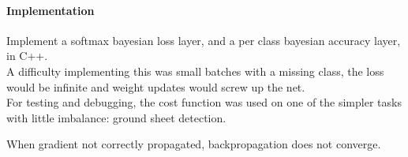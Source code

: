 \documentclass[a4paper,11pt]{article}
\begin{document}
\paragraph{Implementation}

Implement a softmax bayesian loss layer, and a per class bayesian accuracy layer, in C++. \\

A difficulty implementing this was small batches with a missing class, the loss would be infinite and weight updates would screw up the net. \\

For testing and debugging, the cost function was used on one of the simpler tasks with little imbalance: ground sheet detection. 

When gradient not correctly propagated, backpropagation does not converge. \\
\end{document}

